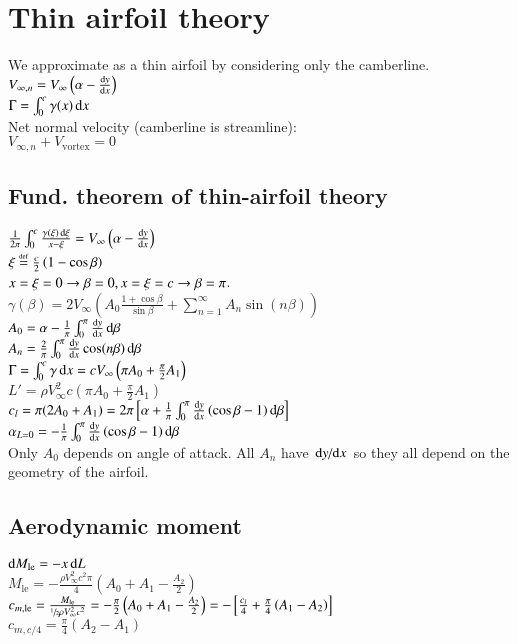 \section{Thin airfoil theory}
We approximate as a thin airfoil by considering only the camberline.\\
$V_{\infty,n}=V_\infty\left(\alpha-\odv{y}{x}\right)$\\
$\Gamma=\int_0^c\gamma(x)\odif{x}$\hfill{}\\
Net normal velocity (camberline is streamline):\\
$V_{\infty,n}+V_\text{vortex}=0$
\subsection*{Fund. theorem of thin-airfoil theory}
$\frac{1}{2\pi}\int_0^c\frac{\gamma(\xi)\odif{\xi}}{x-\xi}=V_\infty\left(\alpha-\odv{y}{x}\right)$\\
$\xi\overset {\underset {\mathrm {def} }{}}{=}\frac{c}{2}\left(1-\cos\beta\right)$\\
$x=\xi=0\to\beta=0,\hfill x=\xi=c\to\beta=\pi$.\\
$\gamma(\beta)=2V_\infty\left(A_0\frac{1+\cos\beta}{\sin\beta}+\sum_{n=1}^\infty A_n\sin(n\beta)\right)$\\
$A_0=\alpha-\frac{1}{\pi}\int_0^\pi\odv{y}{x}\odif{\beta}$\\
$A_n=\frac{2}{\pi}\int_0^\pi\odv{y}{x}\cos(n\beta)\odif{\beta}$\\
$\Gamma=\int_0^c\gamma\odif{x}=cV_\infty\left(\pi A_0+\frac{\pi}{2}A_1\right)$\\
$L'=\rho V_\infty^2c\left(\pi A_0+\frac{\pi}{2}A_1\right)$\\
$c_l=\pi(2A_0+A_1)=2\pi\left[\alpha+\frac{1}{\pi}\int_0^\pi\odv{y}{x}\left(\cos\beta-1\right)\odif{\beta}\right]$\\
$\alpha_{L=0}=-\frac{1}{\pi}\int_0^\pi\odv{y}{x}\left(\cos\beta-1\right)\odif{\beta}$\\
Only $A_0$ depends on angle of attack. All $A_n$ have $\odv{y}/{x}$ so they all depend on the geometry of the airfoil.
\subsection*{Aerodynamic moment}
$\odif{M_\text{le}}=-x\odif{L}$\\
$M_\text{le}=-\frac{\rho V_\infty^2c^2\pi}{4}\left(A_0+A_1-\frac{A_2}{2}\right)$\\
$c_{m,\text{le}}=\frac{M_\text{le}}{\sfrac{1}{2}\rho V_\infty^2c^2}=-\frac{\pi}{2}\left(A_0+A_1-\frac{A_2}{2}\right)=-\left[\frac{c_l}{4}+\frac{\pi}{4}\left(A_1-A_2\right)\right]$\\
$c_{m,c/4}=\frac{\pi}{4}\left(A_2-A_1\right)$
